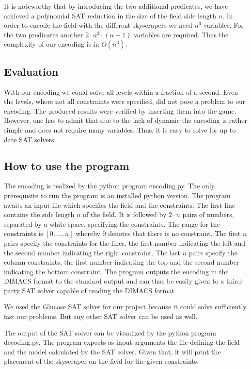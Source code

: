 \documentclass[a4paper, 12pt, titlepage]{article}
\begin{document}
It is noteworthy that by introducing the two additional predicates, we have achieved a polynomial SAT reduction in the size of the field side length $n$. In order to encode the field with the different skyscrapers we need $n^3$ variables. For the two predicates another $2\cdot n^2\cdot(n+1)$ variables are required. Thus the complexity of our encoding is in $O(n^3)$.

\subsection{Evaluation}

With our encoding we could solve all levels within a fraction of a second. Even the levels, where not all constraints were specified, did not pose a problem to our encoding. The produced results were verified by inserting them into the game. However, one has to admit that due to the lack of dynamic the encoding is rather simple and does not require many variables. Thus, it is easy to solve for up to date SAT solvers.

\subsection{How to use the program}
The encoding is realized by the python program encoding.py. The only prerequisite to run the program is an installed python version. The program awaits an input file which specifies the field and the constraints. The first line contains the side length $n$ of the field. It is followed by $2\cdot n$ pairs of numbers, separated by a white space, specifying the constraints. The range for the constraints is $[0,\ldots,n]$ whereby $0$ denotes that there is no constraint. The first $n$ pairs specify the constraints for the lines, the first number indicating the left and the second number indicating the right constraint. The last $n$ pairs specify the column constraints, the first number indicating the top and the second number indicating the bottom constraint. The program outputs the encoding in the DIMACS format to the standard output and can thus be easily given to a third-party SAT solver capable of reading the DIMACS format.

We used the Glucose SAT solver for our project because it could solve sufficiently fast our problems. But any other SAT solver can be used as well.

The output of the SAT solver can be visualized by the python program decoding.py. The program expects as input arguments the file defining the field and the model calculated by the SAT solver. Given that, it will print the placement of the skyscraper on the field for the given constraints.
\end{document}
